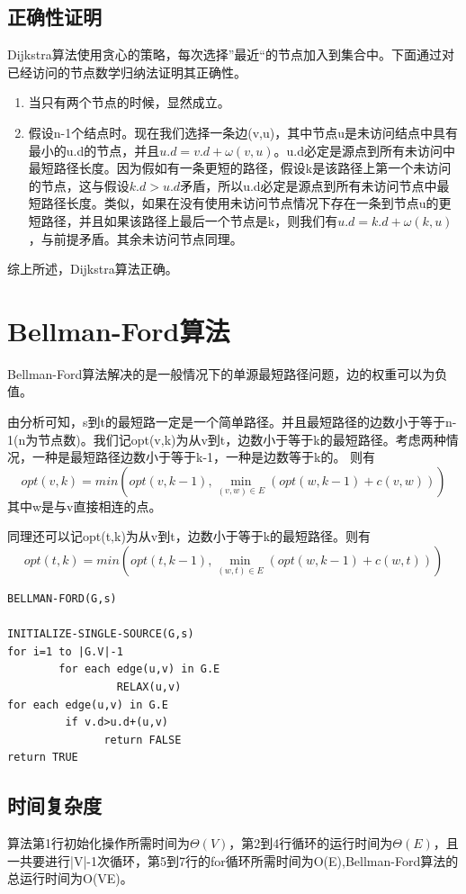 \subsection{正确性证明}
Dijkstra算法使用贪心的策略，每次选择”最近“的节点加入到集合中。下面通过对已经访问的节点数学归纳法证明其正确性。

\begin{enumerate}
\item 当只有两个节点的时候，显然成立。

\item 假设n-1个结点时。现在我们选择一条边(v,u)，其中节点u是未访问结点中具有最小的u.d的节点，并且$u.d=v.d+\omega(v,u)$。u.d必定是源点到所有未访问中最短路径长度。因为假如有一条更短的路径，假设k是该路径上第一个未访问的节点，这与假设$k.d>u.d$矛盾，所以u.d必定是源点到所有未访问节点中最短路径长度。类似，如果在没有使用未访问节点情况下存在一条到节点u的更短路径，并且如果该路径上最后一个节点是k，则我们有$u.d=k.d+\omega(k,u)$，与前提矛盾。其余未访问节点同理。
\end{enumerate}

综上所述，Dijkstra算法正确。

\section{Bellman-Ford算法}
Bellman-Ford算法解决的是一般情况下的单源最短路径问题，边的权重可以为负值。

由分析可知，s到t的最短路一定是一个简单路径。并且最短路径的边数小于等于n-1(n为节点数)。我们记opt(v,k)为从v到t，边数小于等于k的最短路径。考虑两种情况，一种是最短路径边数小于等于k-1，一种是边数等于k的。
则有
$$opt(v,k)=min(opt(v,k-1),\min \limits_{(v,w)\in E}(opt(w,k-1)+c(v,w)))$$
其中w是与v直接相连的点。

同理还可以记opt(t,k)为从v到t，边数小于等于k的最短路径。则有
$$opt(t,k)=min(opt(t,k-1),\min \limits_{(w,t)\in E}(opt(w,k-1)+c(w,t)))$$

\begin{lstlisting}[caption=Bellman-Ford算法算法伪代码]
BELLMAN-FORD(G,s)

INITIALIZE-SINGLE-SOURCE(G,s)
for i=1 to |G.V|-1
        for each edge(u,v) in G.E
		         RELAX(u,v)
for each edge(u,v) in G.E
         if v.d>u.d+(u,v)
		       return FALSE
return TRUE

\end{lstlisting}

\subsection{时间复杂度}
算法第1行初始化操作所需时间为$\Theta (V)$，第2到4行循环的运行时间为$\Theta (E)$，且一共要进行|V|-1次循环，第5到7行的for循环所需时间为O(E),Bellman-Ford算法的总运行时间为O(VE)。


